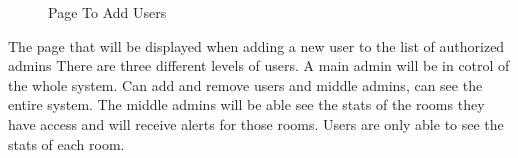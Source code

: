 \documentclass{report}
\begin{document}
\begin{figure}[H]
\caption{Page To Add Users}
\end{figure}
The page that will be displayed when adding a new user to the list of authorized admins
\newline
There are three different levels of users.
A main admin will be in cotrol of the whole system. Can add and remove users and middle admins, can see the entire system.
\newline
The middle admins will be able see the stats of the rooms they have access and will receive alerts for those rooms.
Users are only able to see the stats of each room. 
\end{document}
